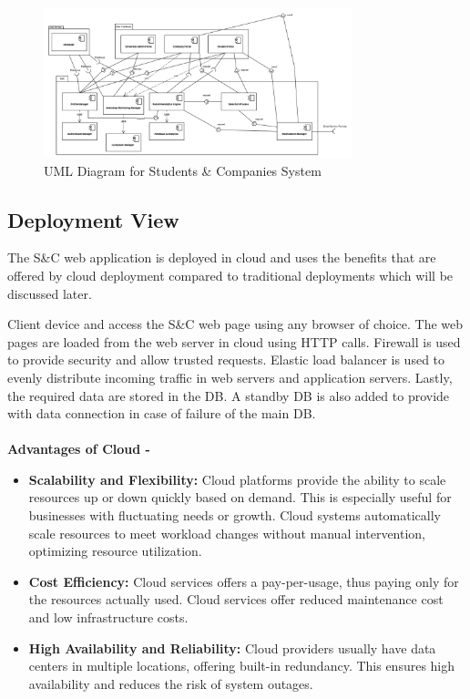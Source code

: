 \begin{figure}[H]
\centering
\includegraphics[width=0.8\textwidth]{Images/Component view Diagram.png}
\caption{\label{fig:metamodel4}UML Diagram for Students \& Companies System}
\end{figure}

\subsection{Deployment View}
The S\&C web application is deployed in cloud and uses the benefits that are offered by cloud deployment compared to traditional deployments which will be discussed later.

Client device and access the S\&C web page using any browser of choice. The web pages are loaded from the web server in cloud using HTTP calls. Firewall is used to provide security and allow trusted requests. Elastic load balancer is used to evenly distribute incoming traffic in web servers and application servers. Lastly, the required data are stored in the DB. A standby DB is also added to provide with data connection in case of failure of the main DB. \\ \\

\textbf{Advantages of Cloud - }
\begin{itemize}
\item \textbf{Scalability and Flexibility:} Cloud platforms provide the ability to scale resources up or down quickly based on demand. This is especially useful for businesses with fluctuating needs or growth. Cloud systems automatically scale resources to meet workload changes without manual intervention, optimizing resource utilization.
\item \textbf{Cost Efficiency:} Cloud services offers a pay-per-usage, thus paying only for the resources actually used. Cloud services offer reduced maintenance cost and low infrastructure costs.
\item \textbf{High Availability and Reliability:} Cloud providers usually have data centers in multiple locations, offering built-in redundancy. This ensures high availability and reduces the risk of system outages.
\end{itemize}


